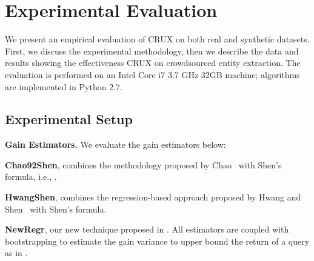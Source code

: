 

\section{Experimental Evaluation}
\label{sec:exps}
We present an empirical evaluation of CRUX on both real and synthetic datasets. 
\iftr First, we discuss the experimental methodology, then we describe the data and results showing the effectiveness CRUX on crowdsourced entity extraction. 
\fi
The evaluation is performed on an Intel Core i7 3.7 GHz 32GB machine; algorithms are implemented in Python 2.7. 

\subsection{Experimental Setup}
\label{sec:expsetup}
\noindent\textbf{Gain Estimators.} We evaluate the gain estimators below:
\squishlist
\item {\bf Chao92Shen}, combines the methodology proposed by Chao~\cite{chao:1992} with Shen's formula, i.e., .
\item {\bf HwangShen}, combines the regression-based approach proposed by Hwang and Shen~\cite{hwang:2010} with Shen's formula. 
\item {\bf NewRegr}, our new technique proposed in .
\squishend
All estimators are coupled with bootstrapping to estimate the gain variance to upper bound the return of a query as in .

